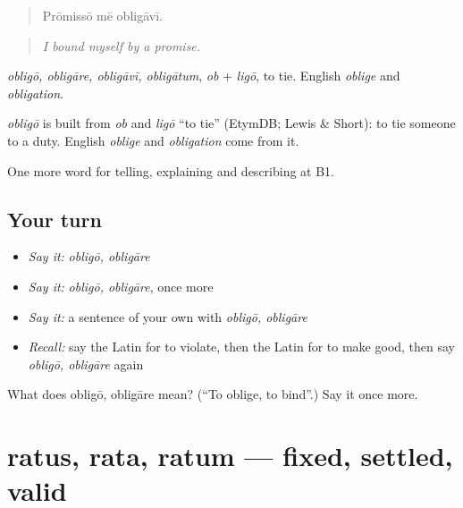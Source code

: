 \begin{quote}
Prōmissō mē obligāvī.
\end{quote}

\begin{quote}
\emph{I bound myself by a promise.}
\end{quote}

\emph{obligō, obligāre, obligāvī, obligātum}, \emph{ob} + \emph{ligō}, to tie. English \emph{oblige} and \emph{obligation}.

\begin{cousinweb}
\emph{obligō} is built from \emph{ob} and \emph{ligō} \textquotedblleft{}to tie\textquotedblright{} (EtymDB; Lewis \& Short): to tie someone to a duty. English \emph{oblige} and \emph{obligation} come from it.
\end{cousinweb}

\begin{grammarlens}[title={What you've built}]
One more word for telling, explaining and describing at B1.
\end{grammarlens}

\subsection*{Your turn}
\begin{itemize}
\raggedright
  \item \emph{Say it:} \emph{obligō, obligāre}
  \item \emph{Say it:} \emph{obligō, obligāre}, once more
  \item \emph{Say it:} a sentence of your own with \emph{obligō, obligāre}
  \item \emph{Recall:} say the Latin for to violate, then the Latin for to make good, then say \emph{obligō, obligāre} again
\end{itemize}

\begin{tcolorbox}[breakable,colback=teal!4,colframe=teal!35!black,title={Before you move on}]
What does obligō, obligāre mean? (\textquotedblleft{}To oblige, to bind\textquotedblright{}.) Say it once more.
\end{tcolorbox}
\section[ratus, rata, ratum]{ratus, rata, ratum — fixed, settled, valid}

\label{lesson:LA-C398-ratus}



